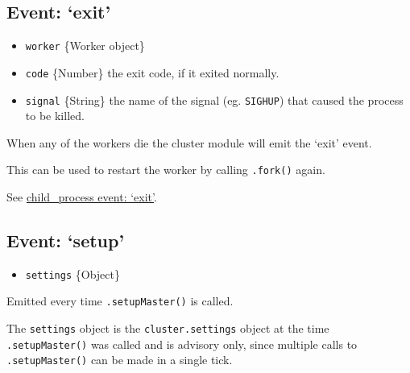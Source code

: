 \subsection{\texorpdfstring{Event:
`exit'}{Event: exit}}\label{event-exit}

\begin{itemize}
\itemsep1pt\parskip0pt
\item
  \texttt{worker} \{Worker object\}
\item
  \texttt{code} \{Number\} the exit code, if it exited normally.
\item
  \texttt{signal} \{String\} the name of the signal (eg.
  \texttt{\textquotesingle{}SIGHUP\textquotesingle{}}) that caused the
  process to be killed.
\end{itemize}

When any of the workers die the cluster module will emit the `exit'
event.

This can be used to restart the worker by calling \texttt{.fork()}
again.

\begin{Shaded}
\end{Shaded}

See \href{child_process.html\#child_process_event_exit}{child\_process
event: `exit'}.

\subsection{\texorpdfstring{Event:
`setup'}{Event: setup}}\label{event-setup}

\begin{itemize}
\itemsep1pt\parskip0pt
\item
  \texttt{settings} \{Object\}
\end{itemize}

Emitted every time \texttt{.setupMaster()} is called.

The \texttt{settings} object is the \texttt{cluster.settings} object at
the time \texttt{.setupMaster()} was called and is advisory only, since
multiple calls to \texttt{.setupMaster()} can be made in a single tick.

